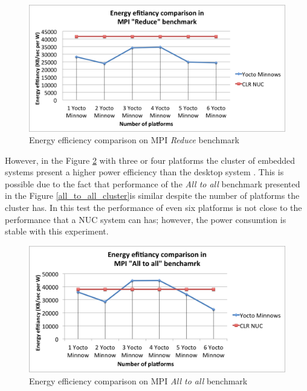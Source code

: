 \begin{figure}[H]
\centering
\includegraphics[width=1 \textwidth]{images/energy_results/reduce.png}
\caption{Energy efficiency comparison on MPI \textit{Reduce} benchmark}
\label{reduce_energy}
\end{figure}

However, in the Figure \ref{alltoall_energy} with three or four platforms the
cluster of embedded systems present a higher power efficiency than the desktop
system \cite{NUC}. This is possible due to the fact that performance of the
\textit{All to all} benchmark presented in the Figure
\ref{all_to_all_cluster}is similar despite the number of platforms the cluster
has. In this test the performance of even six platforms is not close to the
performance that a NUC \cite{NUC} system can has; however, the power consumtion
is stable with this experiment.

\begin{figure}[H]
\centering
\includegraphics[width=1 \textwidth]{images/energy_results/all_to_all.png}
\caption{Energy efficiency comparison on MPI \textit{All to all} benchmark}
\label{alltoall_energy}
\end{figure}

